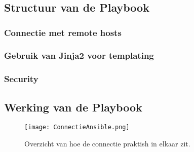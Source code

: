 \chapter{}%
\label{ch:automatisatie}

\section{Structuur van de Playbook}
\label{sec:playbookstructuur}

\subsection{Connectie met remote hosts}

\subsection{Gebruik van Jinja2 voor templating}

\subsection{Security}

\section{Werking van de Playbook}
\label{sec:playbookwerking}

\begin{figure}[H]
    \centering
    \texttt{[image: ConnectieAnsible.png]}
    \caption[Overzicht van hoe de connectie praktish in elkaar zit.]{\label{fig:ansibleconnectie}Overzicht van hoe de connectie praktish in elkaar zit.}
\end{figure}